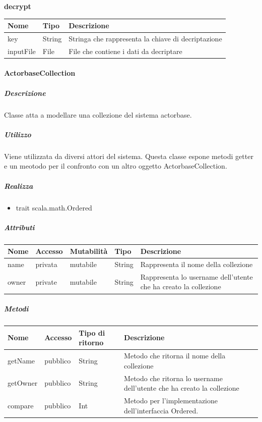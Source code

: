 \documentclass{scalatekids-article}
\begin{document}
\begin{center}
  \textbf{decrypt}\\
\end{center}
\begin{tabular}{| l | l | l |}
  \hline
  Nome & Tipo & Descrizione\\
  \hline
  key & String & Stringa che rappresenta la chiave di decriptazione \\
  \hline
  inputFile & File & File che contiene i dati da decriptare \\
  \hline
\end{tabular}


\paragraph{ActorbaseCollection}
\label{sec:actorbase::actorsystem::utils::ActorbaseCollection}

\subparagraph{Descrizione}
Classe atta a modellare una collezione del sistema actorbase.

\subparagraph{Utilizzo}
Viene utilizzata da diversi attori del sistema. Questa classe espone metodi
getter e un meotodo per il confronto con un altro oggetto ActorbaseCollection.

\subparagraph{Realizza}
\begin{itemize}
\item trait scala.math.Ordered
\end{itemize}

\subparagraph{Attributi}
\begin{tabular}{| p{3cm} | p{1.5cm} | p{2cm} | p{2cm} | p{8.5cm} |}
  \hline
  Nome & Accesso & Mutabilità & Tipo & Descrizione\\
  \hline
  name & privata & mutabile & String & Rappresenta il nome della collezione \\
  \hline
  owner & private & mutabile & String & Rappresenta lo username dell'utente che ha creato la collezione \\
  \hline
\end{tabular}

\subparagraph{Metodi}
\begin{tabular}{| l | l | l | l |}
  \hline
  Nome & Accesso & Tipo di ritorno & Descrizione\\
  \hline
  getName & pubblico & String & Metodo che ritorna il nome della collezione \\
  \hline
  getOwner & pubblico & String & Metodo che ritorna lo username dell'utente che ha creato la collezione \\
  \hline
  compare & pubblico & Int & Metodo per l'implementazione dell'interfaccia Ordered.\\
  \hline
\end{tabular}
\end{document}
